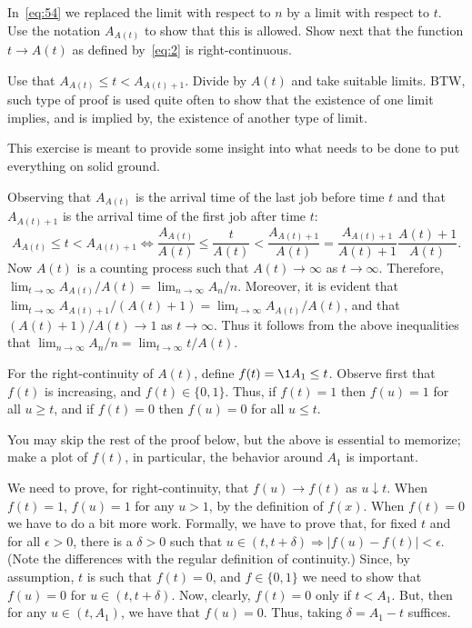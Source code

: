 \begin{extra}
 In~\cref{eq:54} we replaced the limit with respect to $n$ by a limit with respect to $t$.
 Use the notation $A_{A(t)}$ to show that this is allowed.
 Show next that the function $t\to A(t)$ as defined by~\cref{eq:2} is right-continuous.
\begin{hint}
 Use that $A_{A(t)} \leq t < A_{A(t)+1}$.
 Divide by $A(t)$ and take suitable limits.
 BTW, such type of proof is used quite often to show that the existence of one limit implies, and is implied by, the existence of another type of limit.
\end{hint}
\begin{solution}
 This exercise is meant to provide some insight into what needs to be done to put everything on solid ground.


 Observing that $A_{A(t)}$ is the arrival time of the last job before time $t$ and that $A_{A(t)+1}$ is the arrival time of the first job after time $t$:
 \begin{equation*}
 A_{A(t)} \leq t < A_{A(t)+1} \Leftrightarrow 
 \frac{A_{A(t)}} {A(t)} \leq \frac{t}{A(t)} <\frac{A_{A(t)+1}}{A(t)} = \frac{A_{A(t)+1}}{A(t)+1}\frac{A(t)+1}{A(t)}.
 \end{equation*}
 Now $A(t)$ is a counting process such that $A(t)\to\infty$ as $t\to\infty$.
 Therefore, $\lim_{t\to\infty} A_{A(t)}/A(t) = \lim_{n\to\infty} A_n/n$.
 Moreover, it is evident that $\lim_{t\to\infty} A_{A(t)+1}/(A(t)+1) = \lim_{t\to\infty} A_{A(t)}/A(t)$, and that $(A(t)+1)/A(t)\to 1$ as $t\to\infty$.
 Thus it follows from the above inequalities that $\lim_{n\to\infty} A_n/n = \lim_{t\to\infty} t/A(t)$.
 
 For the right-continuity of $A(t)$, define $f(t) = \1{A_1 \leq t}$.
 Observe first that $f(t)$ is increasing, and $f(t)\in\{0,1\}$.
 Thus, if $f(t)=1$ then $f(u)=1$ for all $u\geq t$, and if $f(t)=0$ then $f(u) = 0$ for all $u\leq t$.

 You may skip the rest of the proof below, but the above is essential to memorize; make a plot of $f(t)$, in particular, the behavior around $A_1$ is important.

 We need to prove, for right-continuity, that $f(u)\to f(t) $ as $u\downarrow t$.
 When $f(t)=1$, $f(u)=1$ for any $u>1$, by the definition of $f(x)$.
 When $f(t)=0$ we have to do a bit more work.
 Formally, we have to prove that, for fixed $t$ and for all $\epsilon > 0$, there is a $\delta>0$ such that $u\in(t, t+\delta) \Rightarrow |f(u) -f(t)| < \epsilon$.
 (Note the differences with the regular definition of continuity.)
 Since, by assumption, $t$ is such that $f(t)=0$, and $f\in\{0,1\}$ we need to show that $f(u)=0$ for $u\in(t, t+\delta)$.
 Now, clearly, $f(t)=0$ only if $t < A_1$.
 But, then for any $u\in(t, A_1)$, we have that $f(u) = 0$.
 Thus, taking $\delta = A_1 - t$ suffices.


\end{solution}
\end{extra}
